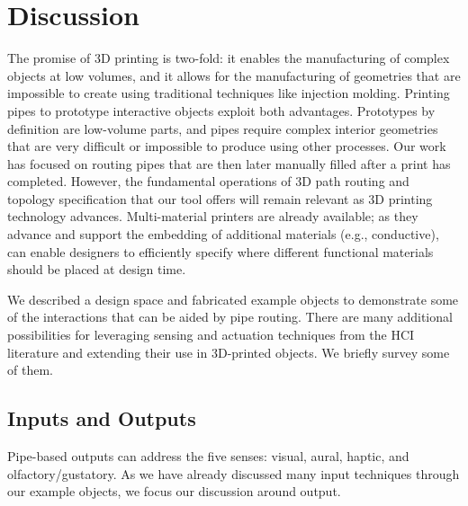 \section{Discussion}

The promise of 3D printing is two-fold: it enables the manufacturing of complex objects at low volumes, and it allows for the manufacturing of geometries that are impossible to create using traditional techniques like injection molding.  Printing pipes to prototype interactive objects exploit both advantages. Prototypes by definition are low-volume parts, and pipes require complex interior geometries that are very difficult or impossible to produce using other processes. Our work has focused on routing pipes that are then later manually filled after a print has completed. However, the fundamental operations of 3D path routing and topology specification that our tool offers will remain relevant as 3D printing technology advances. Multi-material printers are already available; as they advance and support the embedding of additional materials (e.g., conductive), \systemname can enable designers to efficiently specify where different functional materials should be placed at design time.

We described a design space and fabricated example objects to demonstrate some of the interactions that can be aided by pipe routing. There are many additional possibilities for leveraging sensing and actuation techniques from the HCI literature and extending their use in 3D-printed objects. We briefly survey some of them.

\subsection{Inputs and Outputs}

Pipe-based outputs can address the five senses: visual, aural, haptic, and olfactory/gustatory.  As we have already discussed many input techniques through our example objects, we focus our discussion around output.  %

